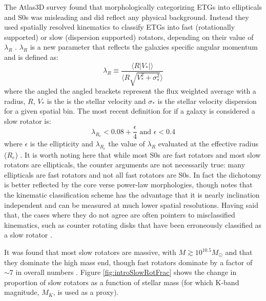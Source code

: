 {{	The Atlas3D survey \citep{Cappellari2011} found that morphologically categorizing ETGs into ellipticals and S0s was misleading and did reflect any physical background. Instead they used spatially resolved kinematics to classify ETGs into fast (rotationally supported) or slow (dispersion supported) rotators, depending on their value of $\lambda_R$ \citep{Emsellem2011}. $\lambda_R$ is a new parameter that reflects the galaxies specific angular momentum and is defined as:
	\begin{equation}
		\lambda_R \equiv \frac{\langle R |V_\ast|\rangle}{\langle R \sqrt{V_\ast^2 + \sigma_\ast^2}\rangle}
	\end{equation}
	where the angled the angled brackets represent the flux weighted average with a radius, $R$, $V_\ast$ is the is the stellar velocity and $\sigma_\ast$ is the stellar velocity dispersion for a given spatial bin. The most recent definition for if a galaxy is considered a slow rotator is:
	\begin{equation}
		\lambda_{R_e} < 0.08 + \frac{\epsilon}{4} \text{  and  } \epsilon < 0.4
	\end{equation}
	where $\epsilon$ is the ellipticity and $\lambda_{R_e}$ the value of $\lambda_R$ evaluated at the effective radius ($R_e$) \citep{}. %
	It is worth noting here that while most S0s are fast rotators and most slow rotators are ellipticals, the counter arguments are not necessarily true: many ellipticals are fast rotators and not all fast rotators are S0s. In fact the dichotomy is better reflected by the core verse power-law morphologies, though \citet{Cappellari2016} notes that the kinematic classification scheme has the advantage that it is nearly inclination independent and can be measured at much lower spatial resolutions. Having said that, the cases where they do not agree are often pointers to misclassified kinematics, such as counter rotating disks that have been erroneously classified as a slow rotator \citep{Pinkney2003, Cappellari2005, Cappellari2007}. 

	It was found that most slow rotators are massive, with $M \gtrsim 10^{10.5} M_\odot$ and that they dominate the high mass end, though fast rotators dominate by a factor of $\sim 7$ in overall numbers \citep{Emsellem2011, Veale2016}. Figure \ref{fig:introSlowRotFrac} shows the change in proportion of slow rotators as a function of stellar mass (for which K-band magnitude, $M_K$, is used as a proxy).


}}
